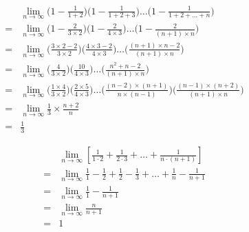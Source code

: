 	\begin{align*}
		&\lim_{n\rightarrow\infty}\Big(1-\frac{1}{1+2}\Big)\Big(1-\frac{1}{1+2+3}\Big)\dots\Big(1-\frac{1}{1+2+\dots+n}\Big)\\
		=&\lim_{n\rightarrow\infty}\Big(1-\frac{2}{3\times2}\Big)\Big(1-\frac{2}{4\times3}\Big)\dots\Big(1-\frac{2}{(n+1)\times{n}}\Big)\\
		=&\lim_{n\rightarrow\infty}\Big(\frac{3\times2-2}{3\times2}\Big)\Big(\frac{4\times3-2}{4\times3}\Big)\dots\Big(\frac{(n+1)\times{n}-2}{(n+1)\times{n}}\Big)\\
		=&\lim_{n\rightarrow\infty}\Big(\frac{4}{3\times2}\Big)\Big(\frac{10}{4\times3}\Big)\dots\Big(\frac{n^2+n-2}{(n+1)\times{n}}\Big)\\
		=&\lim_{n\rightarrow\infty}\Big(\frac{1\times4}{3\times2}\Big)\Big(\frac{2\times5}{4\times3}\Big)\dots\Big(\frac{(n-2)\times(n+1)}{n\times(n-1)}\Big)\Big(\frac{(n-1)\times(n+2)}{(n+1)\times{n}}\Big)\\
		=&\lim_{n\rightarrow\infty}\frac{1}{3}\times\frac{n+2}{n}\\
		=&\frac{1}{3}
	\end{align*}	

\begin{align*}
	&\lim_{n\rightarrow\infty}[\frac{1}{1\cdot2}+\frac{1}{2\cdot3}+\dots+\frac{1}{n\cdot(n+1)}]\\
	=&\lim_{n\rightarrow\infty} \frac{1}{1}-\frac{1}{2}+\frac{1}{2}-\frac{1}{3}+\dots+\frac{1}{n}-\frac{1}{n+1}\\
	=&\lim_{n\rightarrow\infty}\frac{1}{1}-\frac{1}{n+1}\\
	=&\lim_{n\rightarrow\infty}\frac{n}{n+1}\\
	=&1
\end{align*}

